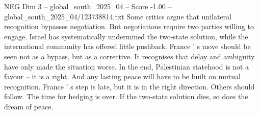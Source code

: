 \begin{textsample}{NEG Dim 3 – global\_south\_2025\_04 – Score -1.00 – global\_south\_2025\_04/123738814.txt}
Some critics argue that unilateral recognition bypasses negotiation.
But negotiations require two parties willing to engage.
Israel has systematically undermined the two-state solution, while the international community has offered little pushback.
France ' s move should be seen not as a bypass, but as a corrective.
It recognises that delay and ambiguity have only made the situation worse.
In the end, Palestinian statehood is not a favour -- it is a right.
And any lasting peace will have to be built on mutual recognition.
France ' s step is late, but it is in the right direction.
Others should follow.
The time for hedging is over.
If the two-state solution dies, so does the dream of peace.

\end{textsample}
